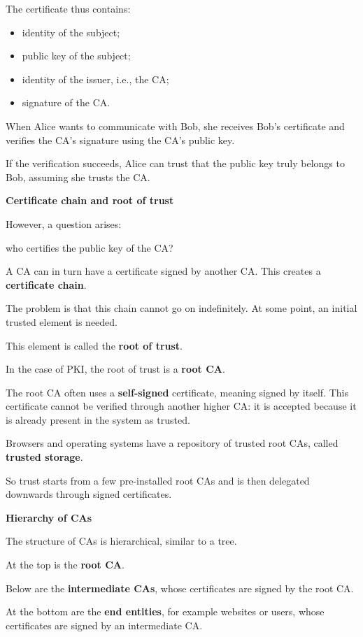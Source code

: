 \documentclass{article}
\begin{document}
The certificate thus contains:

\begin{itemize}
\item identity of the subject;
\item public key of the subject;
\item identity of the issuer, i.e., the CA;
\item signature of the CA.
\end{itemize}

When Alice wants to communicate with Bob, she receives Bob's certificate and verifies the CA's signature using the CA's public key.

If the verification succeeds, Alice can trust that the public key truly belongs to Bob, assuming she trusts the CA.

\textbf{Certificate chain and root of trust}

However, a question arises:

who certifies the public key of the CA?

A CA can in turn have a certificate signed by another CA. This creates a \textbf{certificate chain}.

The problem is that this chain cannot go on indefinitely. At some point, an initial trusted element is needed.

This element is called the \textbf{root of trust}.

In the case of PKI, the root of trust is a \textbf{root CA}.

The root CA often uses a \textbf{self-signed} certificate, meaning signed by itself. This certificate cannot be verified through another higher CA: it is accepted because it is already present in the system as trusted.

Browsers and operating systems have a repository of trusted root CAs, called \textbf{trusted storage}.

So trust starts from a few pre-installed root CAs and is then delegated downwards through signed certificates.

\textbf{Hierarchy of CAs}

The structure of CAs is hierarchical, similar to a tree.

At the top is the \textbf{root CA}.

Below are the \textbf{intermediate CAs}, whose certificates are signed by the root CA.

At the bottom are the \textbf{end entities}, for example websites or users, whose certificates are signed by an intermediate CA.
\end{document}
